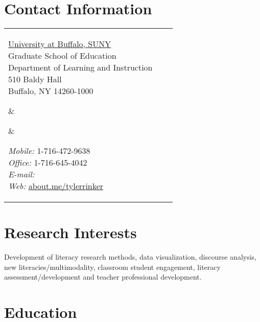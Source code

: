 


\section{Contact Information}


\newlength{\rcollength}\setlength{\rcollength}{2.1in}%
\newlength{\spacewidth}\setlength{\spacewidth}{20pt}
\begin{tabular}[t]{@{}p{\textwidth-\rcollength-\spacewidth}@{}p{\spacewidth}@{}p{\rcollength}}%

\parbox{\textwidth-\rcollength-\spacewidth}{%
\href{http://www.buffalo.edu/}{University at Buffalo, SUNY}\\
Graduate School of Education\\
Department of Learning and Instruction\\	
510 Baldy Hall\\
Buffalo, NY 14260-1000\\}

&
\parbox[m][5\baselineskip]{\spacewidth}{} &

\parbox{\rcollength}{%
\textit{Mobile:} 1-716-472-9638 \\
\textit{Office:} 1-716-645-4042 \\
\textit{E-mail:} \\
\textit{Web:} \href{http://about.me/tylerrinker}{about.me/tylerrinker}}

\end{tabular}

\section{Research Interests}

Development of literacy research methods, data visualization, discourse analysis, new literacies/multimodality, classroom student engagement, literacy assessment/development and teacher professional development.

\section{Education}

